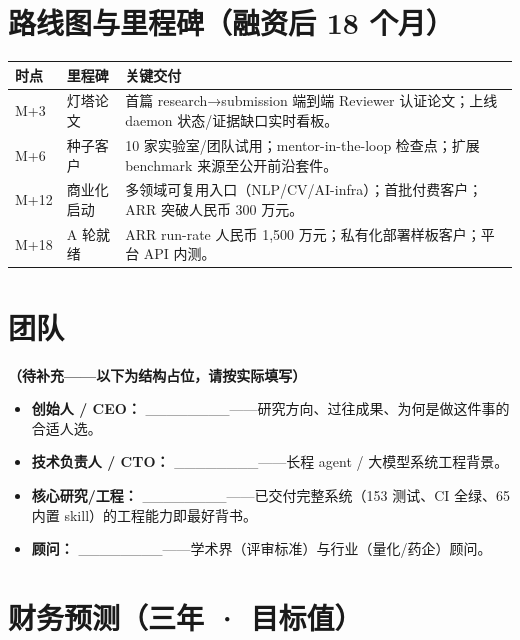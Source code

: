 \documentclass[UTF8,11pt,fontset=none]{ctexart}
\newcommand{\hl}[1]{\textbf{\color{argusnavy}#1}}
\newcommand{\thd}[1]{\textbf{\color{white}#1}}
\newcommand{\headrow}{\rowcolor{argusnavy}}
\newcommand{\altrow}{\rowcolor{arguslight}}
\begin{document}
\section{路线图与里程碑（融资后 18 个月）}

\begin{tabularx}{\textwidth}{@{}l >{\raggedright\arraybackslash}p{3.0cm} X@{}}
\toprule
\headrow \thd{时点} & \thd{里程碑} & \thd{关键交付} \\
\midrule
\altrow M+3 & 灯塔论文 & 首篇 research→submission 端到端 Reviewer 认证论文；上线 daemon 状态/证据缺口实时看板。 \\
M+6 & 种子客户 & 10 家实验室/团队试用；mentor-in-the-loop 检查点；扩展 benchmark 来源至公开前沿套件。 \\
\altrow M+12 & 商业化启动 & 多领域可复用入口（NLP/CV/AI-infra）；首批付费客户；ARR 突破人民币 300 万元。 \\
M+18 & A 轮就绪 & ARR run-rate 人民币 1,500 万元；私有化部署样板客户；平台 API 内测。 \\
\bottomrule
\end{tabularx}

\section{团队}

\textbf{（待补充——以下为结构占位，请按实际填写）}
\begin{itemize}
  \item \hl{创始人 / CEO：} \_\_\_\_\_\_\_\_——研究方向、过往成果、为何是做这件事的合适人选。
  \item \hl{技术负责人 / CTO：} \_\_\_\_\_\_\_\_——长程 agent / 大模型系统工程背景。
  \item \hl{核心研究/工程：} \_\_\_\_\_\_\_\_——已交付完整系统（153 测试、CI 全绿、65 内置 skill）的工程能力即最好背书。
  \item \hl{顾问：} \_\_\_\_\_\_\_\_——学术界（评审标准）与行业（量化/药企）顾问。
\end{itemize}

\section{财务预测（三年 · 目标值）}
\end{document}
